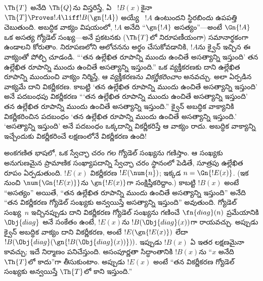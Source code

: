 \documentclass[../../../include/open-logic-section]{subfiles}
\begin{document}


\begin{explain}
$\Th{T}$ అనేది $\Th{Q}$ను విస్తరిస్తే, ఏ ~$!B(x)$కైనా
$\Th{T} \Proves !A \liff !B(\gn{!A})$ అయ్యే ~$!A$ ఉంటుందని
స్థిరబిందు ఉపపత్తి చెబుతుంది. అబద్ధిక వాక్యం విషయంలో, $!A$ అనేది
``$\gn{!A}$ అసత్యం''---అంటే $\Gn{!A}$ ఒక అసత్య  గ్యోడెల్
సంఖ్య---అనే ప్రకటనకు ($\Th{T}$లో నిరూపణీయంగా) సమానార్థకంగా ఉండాలని కోరుతాం.
నిరూపణలోని ఆలోచనను అర్థం చేసుకోవడానికి, $!A$ను క్వైన్ ఇచ్చిన ఈ వాక్యంతో
పోల్చి చూడండి. ``‘తన ఉల్లేఖిత రూపాన్ని ముందు ఉంచితే అసత్యాన్ని ఇస్తుంది’
తన ఉల్లేఖిత రూపాన్ని ముందు ఉంచితే అసత్యాన్ని ఇస్తుంది.''
ఒక వ్యక్తీకరణకు దాని ఉల్లేఖిత రూపాన్ని ముందుంచి వాక్యం నిర్మిస్తే,
ఆ వ్యక్తీకరణను \emph{వికర్ణీకరించాం} అనవచ్చు. అలా ఏర్పడిన వాక్యమే దాని
వికర్ణీకరణ. కాబట్టి ‘తన ఉల్లేఖిత రూపాన్ని ముందు ఉంచితే అసత్యాన్ని ఇస్తుంది’
అనే పదబంధపు వికర్ణీకరణ ``‘తన ఉల్లేఖిత రూపాన్ని ముందు ఉంచితే అసత్యాన్ని ఇస్తుంది’
తన ఉల్లేఖిత రూపాన్ని ముందు ఉంచితే అసత్యాన్ని ఇస్తుంది.'' క్వైన్ అబద్ధిక
వాక్యానికి వికర్ణీకరించిన పదబంధం ‘తన ఉల్లేఖిత రూపాన్ని ముందు ఉంచితే అసత్యాన్ని
ఇస్తుంది.’ ‘అసత్యాన్ని ఇస్తుంది’ అనే పదబంధం ఒక్కదాన్ని వికర్ణీకరిస్తే ఆ వాక్యం
రాదు. అబద్ధిక వాక్యాన్ని ఇచ్చేందుకు వికర్ణీకరించే లక్షణంలోనే వికర్ణీకరణ ఉంది!{}

అంకగణిత భాషలో, ఒక స్వేచ్ఛా చరం గల  గ్యోడెల్ సంఖ్యను
గణిస్తాం. ఆ సంఖ్యకు అనుగుణమైన ప్రామాణిక సంఖ్యాపదాన్ని స్వేచ్ఛా
చరం స్థానంలో పెడితే, సూత్రపు ఉల్లేఖిత రూపం ఏర్పడుతుంది. $!E(x)$ వికర్ణీకరణ
$!E(\num{n})$; ఇక్కడ $n = \Gn{!E(x)}$. (ఇక నుంచి $\num{\Gn{!E(x)}}$ను
$\gn{!E(x)}$గా సంక్షిప్తీకరిద్దాం.) కాబట్టి $!B(x)$ అంటే ``అసత్యం'' అయితే,
``తన ఉల్లేఖిత రూపాన్ని ముందు ఉంచితే అసత్యాన్ని ఇస్తుంది'' అనేది
``తన వికర్ణీకరణ గ్యోడెల్ సంఖ్యకు అన్వయిస్తే అసత్యాన్ని ఇస్తుంది'' అవుతుంది.
 గ్యోడెల్ సంఖ్య~$n$ ఇచ్చినప్పుడు దాని వికర్ణీకరణ గ్యోడెల్
సంఖ్యను గణించే $\fn{diag}(n)$ ప్రమేయానికి $\Obj{diag}$ అనే సంకేతం ఉంటే,
$!E(x)$ను $!B(\Obj{diag}(x))$గా రాయవచ్చు. అప్పుడు క్వైన్ అబద్ధిక వాక్యం
దాని వికర్ణీకరణ, అంటే $!E(\gn{!E(x)})$ లేదా
$!B(\Obj{diag}(\gn{!B(\Obj{diag}(x))}))$. ఇప్పుడు $!B(x)$ ఏ ఇతర లక్షణమైనా
కావచ్చు; ఇదే నిర్మాణం పనిచేస్తుంది. అసంపూర్ణతా సిద్ధాంతానికి $!B(x)$ను
``$x$ అనేది $\Th{T}$లో  కాదు''గా తీసుకుంటాం. అప్పుడు
$!E(x)$ అంటే ``తన వికర్ణీకరణ గ్యోడెల్ సంఖ్యకు అన్వయిస్తే $\Th{T}$లో
 కాని  ఇస్తుంది.''


\end{explain}
\end{document}
